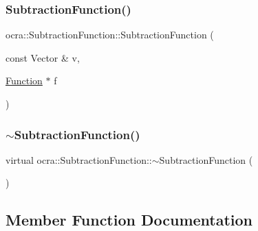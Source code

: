 \hypertarget{classocra_1_1SubtractionFunction_ab825dea759ffedcdd1c30b19e1df02f1}{}\label{classocra_1_1SubtractionFunction_ab825dea759ffedcdd1c30b19e1df02f1} 
\subsubsection{\texorpdfstring{Subtraction\+Function()}{SubtractionFunction()}\hspace{0.1cm}{\footnotesize\ttfamily [2/2]}}
{\footnotesize\ttfamily ocra\+::\+Subtraction\+Function\+::\+Subtraction\+Function (\begin{DoxyParamCaption}\item[{const Vector \&}]{v,  }\item[{\hyperlink{classocra_1_1Function}{Function} $\ast$}]{f }\end{DoxyParamCaption})}

\hypertarget{classocra_1_1SubtractionFunction_a87e030eb99b05722464881e3bb220027}{}\label{classocra_1_1SubtractionFunction_a87e030eb99b05722464881e3bb220027} 
\subsubsection{\texorpdfstring{$\sim$\+Subtraction\+Function()}{~SubtractionFunction()}}
{\footnotesize\ttfamily virtual ocra\+::\+Subtraction\+Function\+::$\sim$\+Subtraction\+Function (\begin{DoxyParamCaption}{ }\end{DoxyParamCaption})\hspace{0.3cm}{\ttfamily [virtual]}}



\subsection{Member Function Documentation}
\hypertarget{classocra_1_1SubtractionFunction_a00ed4b4afd66bd91dea2f2ebbcd5b615}{}\label{classocra_1_1SubtractionFunction_a00ed4b4afd66bd91dea2f2ebbcd5b615} 

